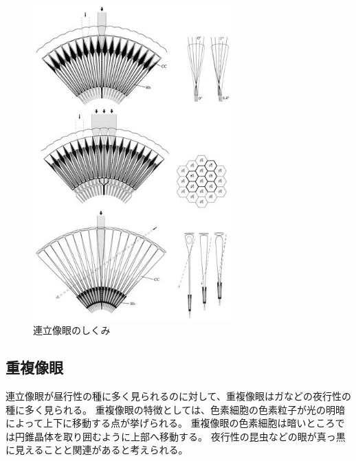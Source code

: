 \begin{figure}[hn]
  \centering
  \includegraphics[width=3.0in]{./img/renrituzougan.jpg}
  \caption{連立像眼のしくみ}
  \label{FExpparts}
\end{figure}


\subsection{重複像眼}

連立像眼が昼行性の種に多く見られるのに対して、重複像眼はガなどの夜行性の種に多く見られる。
重複像眼の特徴としては、色素細胞の色素粒子が光の明暗によって上下に移動する点が挙げられる。
重複像眼の色素細胞は暗いところでは円錐晶体を取り囲むように上部へ移動する。
夜行性の昆虫などの眼が真っ黒に見えることと関連があると考えられる。

